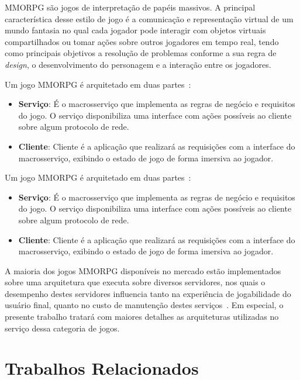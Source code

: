 \ac{MMORPG} são jogos de interpretação de papéis massivos.
%
A principal característica desse estilo de jogo é a comunicação e representação virtual de um mundo fantasia no qual cada jogador pode interagir com objetos virtuais compartilhados ou tomar ações sobre outros jogadores em tempo real, tendo como principais objetivos a resolução de problemas conforme a sua regra de \textit{design}, o desenvolvimento do personagem e a interação entre os jogadores\cite{video_game_technologies}.
%

Um jogo \ac{MMORPG} é arquitetado em duas partes~\cite{mmo_analytic}:
\begin{itemize}
  \item \textbf{Serviço}: É o macrosserviço que implementa as regras de negócio e requisitos do jogo.
  O serviço disponibiliza uma interface com ações possíveis ao cliente sobre algum protocolo de rede.
  \item \textbf{Cliente}: Cliente é a aplicação que realizará as requisições com a interface do macrosserviço, exibindo o estado de jogo de forma imersiva ao jogador.
\end{itemize}


Um jogo \ac{MMORPG} é arquitetado em duas partes~\cite{mmo_analytic}:
\begin{itemize}
  \item \textbf{Serviço}: É o macrosserviço que implementa as regras de negócio e requisitos do jogo.
  O serviço disponibiliza uma interface com ações possíveis ao cliente sobre algum protocolo de rede.
  \item \textbf{Cliente}: Cliente é a aplicação que realizará as requisições com a interface do macrosserviço, exibindo o estado de jogo de forma imersiva ao jogador.
\end{itemize}

A maioria dos jogos \ac{MMORPG} disponíveis no mercado estão implementados sobre uma arquitetura que executa sobre diversos servidores\cite{stephenclarkewillson2017}, nos quais o desempenho destes servidores influencia tanto na experiência de jogabilidade do usuário final, quanto no custo de manutenção destes serviços~\cite{1417630}.
%
Em especial, o presente trabalho tratará com maiores detalhes as arquiteturas utilizadas no serviço dessa categoria de jogos.

\section{Trabalhos Relacionados}
\label{sec:similares}

